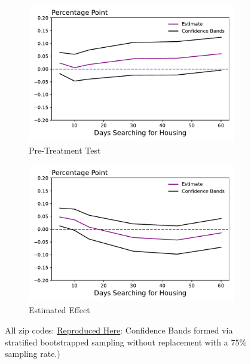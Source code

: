 \documentclass[a4paper,12pt]{article}
\begin{document}
\begin{figure}[htbp]
\centering
\begin{subfigure}{.48\textwidth}
    \centering
    \includegraphics[width=.95\linewidth]{figures/rtc/results/cceh/diff_in_mean_False_False_True.pdf}
    \caption{Pre-Treatment Test}
    \label{SUBFIGURE LABEL 3}
\end{subfigure}
\begin{subfigure}{.48\textwidth}
    \centering
    \includegraphics[width=.95\linewidth]{figures/rtc/results/cceh/diff_in_mean_False_False_False.pdf}
    \caption{Estimated Effect}
    \label{fig:diff_mean_high}
\end{subfigure}
\caption{ All zip codes: \href{https://github.com/pharringtonp19/evictions/blob/main/scripts/cceh/primary/diff_n_mean_rrh.py}{Reproduced Here}: Confidence Bands formed via stratified bootstrapped sampling without replacement with a $75\%$ sampling rate.)}
\label{fig:diff_mean}
\end{figure}
\end{document}
